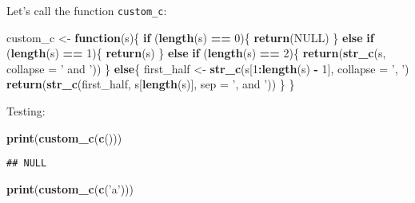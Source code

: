 \documentclass[]{article}
\newenvironment{Shaded}{\begin{snugshade}}{\end{snugshade}}
\newcommand{\KeywordTok}[1]{\textcolor[rgb]{0.13,0.29,0.53}{\textbf{#1}}}
\newcommand{\DataTypeTok}[1]{\textcolor[rgb]{0.13,0.29,0.53}{#1}}
\newcommand{\DecValTok}[1]{\textcolor[rgb]{0.00,0.00,0.81}{#1}}
\newcommand{\StringTok}[1]{\textcolor[rgb]{0.31,0.60,0.02}{#1}}
\newcommand{\OtherTok}[1]{\textcolor[rgb]{0.56,0.35,0.01}{#1}}
\newcommand{\ControlFlowTok}[1]{\textcolor[rgb]{0.13,0.29,0.53}{\textbf{#1}}}
\newcommand{\OperatorTok}[1]{\textcolor[rgb]{0.81,0.36,0.00}{\textbf{#1}}}
\newcommand{\NormalTok}[1]{#1}
\theoremstyle{definition}
\theoremstyle{definition}
\theoremstyle{definition}
\theoremstyle{remark}
\begin{document}
Let's call the function \texttt{custom\_c}:

\begin{Shaded}
\begin{Highlighting}[]
\NormalTok{custom_c <-}\StringTok{ }\ControlFlowTok{function}\NormalTok{(s)\{}
  \ControlFlowTok{if}\NormalTok{ (}\KeywordTok{length}\NormalTok{(s) }\OperatorTok{==}\StringTok{ }\DecValTok{0}\NormalTok{)\{}
    \KeywordTok{return}\NormalTok{(}\OtherTok{NULL}\NormalTok{)}
\NormalTok{  \} }\ControlFlowTok{else} \ControlFlowTok{if}\NormalTok{ (}\KeywordTok{length}\NormalTok{(s) }\OperatorTok{==}\StringTok{ }\DecValTok{1}\NormalTok{)\{}
    \KeywordTok{return}\NormalTok{(s)}
\NormalTok{  \} }\ControlFlowTok{else} \ControlFlowTok{if}\NormalTok{ (}\KeywordTok{length}\NormalTok{(s) }\OperatorTok{==}\StringTok{ }\DecValTok{2}\NormalTok{)\{}
    \KeywordTok{return}\NormalTok{(}\KeywordTok{str_c}\NormalTok{(s, }\DataTypeTok{collapse =} \StringTok{' and '}\NormalTok{))}
\NormalTok{  \} }\ControlFlowTok{else}\NormalTok{\{}
\NormalTok{    first_half <-}\StringTok{ }\KeywordTok{str_c}\NormalTok{(s[}\DecValTok{1}\OperatorTok{:}\KeywordTok{length}\NormalTok{(s) }\OperatorTok{-}\StringTok{ }\DecValTok{1}\NormalTok{], }\DataTypeTok{collapse =} \StringTok{', '}\NormalTok{)}
    \KeywordTok{return}\NormalTok{(}\KeywordTok{str_c}\NormalTok{(first_half, s[}\KeywordTok{length}\NormalTok{(s)], }\DataTypeTok{sep =} \StringTok{', and '}\NormalTok{))}
\NormalTok{  \}}
\NormalTok{\}}
\end{Highlighting}
\end{Shaded}

Testing:

\begin{Shaded}
\begin{Highlighting}[]
\KeywordTok{print}\NormalTok{(}\KeywordTok{custom_c}\NormalTok{(}\KeywordTok{c}\NormalTok{()))}
\end{Highlighting}
\end{Shaded}

\begin{verbatim}
## NULL
\end{verbatim}

\begin{Shaded}
\begin{Highlighting}[]
\KeywordTok{print}\NormalTok{(}\KeywordTok{custom_c}\NormalTok{(}\KeywordTok{c}\NormalTok{(}\StringTok{'a'}\NormalTok{)))}
\end{Highlighting}
\end{Shaded}
\end{document}
